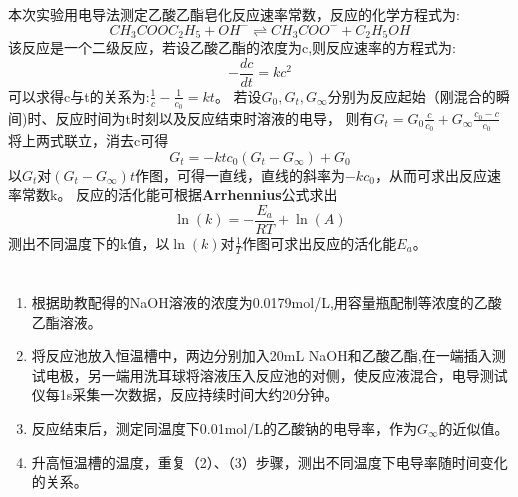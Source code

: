 ﻿\documentclass[10.5pt]{article}
\begin{document}
\title{\textbf{}} %
\author{}
\date{}
\maketitle
\section{\textbf{}}
本次实验用电导法测定乙酸乙酯皂化反应速率常数，反应的化学方程式为:
\begin{equation}
CH_3COOC_2H_5+OH^-\rightleftharpoons CH_3COO^-+C_2H_5OH
\end{equation}
该反应是一个二级反应，若设乙酸乙酯的浓度为c,则反应速率的方程式为:
\begin{equation}
-\frac{d c}{dt}=kc^2
\end{equation}
可以求得c与t的关系为:$\frac{1}{c}-\frac{1}{c_0}=kt$。
若设$G_0,G_t,G_{\infty}$分别为反应起始（刚混合的瞬间)时、反应时间为t时刻以及反应结束时溶液的电导，
则有$G_t=G_0 \frac{c}{c_0}+G_{\infty} \frac{c_0-c}{c_0}$\\
将上两式联立，消去c可得
\begin{equation}
G_t=-ktc_0(G_t-G_{\infty})+G_0
\end{equation}
以$G_t$对$(G_t-G_{\infty})t$作图，可得一直线，直线的斜率为$-kc_0$，从而可求出反应速率常数k。
反应的活化能可根据\textbf{Arrhennius}公式求出
\begin{equation}
\ln(k)=-\frac{E_a}{RT}+\ln(A)
\end{equation}
测出不同温度下的k值，以$\ln(k)$对$\frac{1}{T}$作图可求出反应的活化能$E_a$。
\section{\textbf{}}

\subsection{\textbf{}}
\begin{enumerate}
\item 根据助教配得的NaOH溶液的浓度为0.0179mol/L,用容量瓶配制等浓度的乙酸乙酯溶液。
\item 将反应池放入恒温槽中，两边分别加入20mL NaOH和乙酸乙酯,在一端插入测试电极，另一端用洗耳球将溶液压入反应池的对侧，使反应液混合，电导测试仪每1s采集一次数据，反应持续时间大约20分钟。
\item 反应结束后，测定同温度下0.01mol/L的乙酸钠的电导率，作为$G_{\infty}$的近似值。
\item 升高恒温槽的温度，重复（2）、（3）步骤，测出不同温度下电导率随时间变化的关系。
\end{enumerate}
\end{document}
